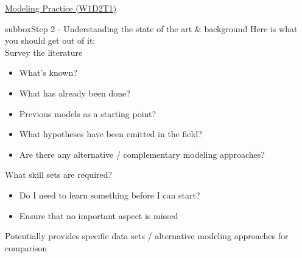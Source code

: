 \begin{textbox}{\href{https://compneuro.neuromatch.io/tutorials/W1D2_ModelingPractice/W1D2_Intro.html}{Modeling Practice  (W1D2T1)} }

\begin{subbox}{subbox}{Step 2 - Understanding the state of the art \& background}
\scriptsize
Here is what you should get out of it:\\
Survey the literature
\begin{itemize}
    \item 
   What’s known?
  \item  What has already been done?
  \item  Previous models as a starting point?
  \item  What hypotheses have been emitted in the field?
  \item  Are there any alternative / complementary modeling approaches?
  \end{itemize}

What skill sets are required?
\begin{itemize}

  \item  Do I need to learn something before I can start?
  \item  Ensure that no important aspect is missed
  \end{itemize}

Potentially provides specific data sets / alternative modeling approaches for comparison

\end{subbox}

\end{textbox}

